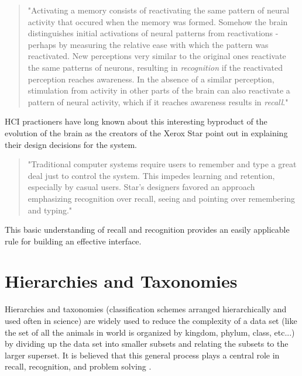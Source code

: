 \begin{quote}
"Activating a memory consists of reactivating the same pattern of neural activity that occured when the memory was formed. Somehow the brain distinguishes initial activations of neural patterns from reactivations - perhaps by measuring the relative ease with which the pattern was reactivated. New perceptions very similar to the original ones reactivate the same patterns of neurons, resulting in \emph{recognition} if the reactivated perception reaches awareness. In the absence of a similar perception, stimulation from activity in other parts of the brain can also reactivate a pattern of neural activity, which if it reaches awareness results in \emph{recall}." \cite{mindinmind2010}
\end{quote}

HCI practioners have long known about this interesting byproduct of the evolution of the brain as the creators of the Xerox Star point out in explaining their design decisions for the system.

\begin{quote}
"Traditional computer systems require users to remember and type a great deal just to control the system. This impedes learning and retention, especially by casual users. Star's designers favored an approach emphasizing recognition over recall, seeing and pointing over remembering and typing." \cite{xeroxstar1989}
\end{quote}

This basic understanding of recall and recognition provides an easily applicable rule for building an effective interface.

\section{Hierarchies and Taxonomies}

\begin{comment}
Papers:
Magic number seven, George Miller
recoding pg. 93
increasing bits per chunk
The Structure of the Information Visualization Design Space, Section 2
enclosure
Coding Recoding Hierarchical Information
Acquisiton and forgetting of hierarchically organized information
\end{comment}

Hierarchies and taxonomies (classification schemes arranged hierarchically and used often in science) are widely used to reduce the complexity of a data set (like the set of all the animals in world is organized by kingdom, phylum, class, etc...) by dividing up the data set into smaller subsets and relating the subsets to the larger superset. It is believed that this general process plays a central role in recall, recognition, and problem solving \cite{seven1956}\cite{graphicalhierarchy1972}\cite{hierarchical1971}. 

